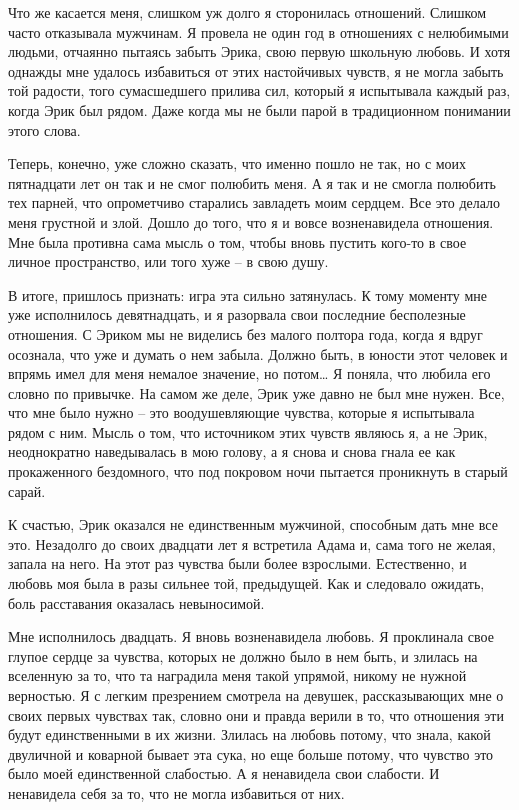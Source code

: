 \documentclass[
]{book}
\begin{document}
Что же касается меня, слишком уж долго я сторонилась отношений. Слишком часто отказывала мужчинам. Я провела не один год в отношениях с нелюбимыми людьми, отчаянно пытаясь забыть Эрика, свою первую школьную любовь. И хотя однажды мне удалось избавиться от этих настойчивых чувств, я не могла забыть той радости, того сумасшедшего прилива сил, который я испытывала каждый раз, когда Эрик был рядом. Даже когда мы не были парой в традиционном понимании этого слова.

Теперь, конечно, уже сложно сказать, что именно пошло не так, но с моих пятнадцати лет он так и не смог полюбить меня. А я так и не смогла полюбить тех парней, что опрометчиво старались завладеть моим сердцем. Все это делало меня грустной и злой. Дошло до того, что я и вовсе возненавидела отношения. Мне была противна сама мысль о том, чтобы вновь пустить кого-то в свое личное пространство, или того хуже -- в свою душу.

В итоге, пришлось признать: игра эта сильно затянулась. К тому моменту мне уже исполнилось девятнадцать, и я разорвала свои последние бесполезные отношения. С Эриком мы не виделись без малого полтора года, когда я вдруг осознала, что уже и думать о нем забыла. Должно быть, в юности этот человек и впрямь имел для меня немалое значение, но потом\ldots{} Я поняла, что любила его словно по привычке. На самом же деле, Эрик уже давно не был мне нужен. Все, что мне было нужно -- это воодушевляющие чувства, которые я испытывала рядом с ним. Мысль о том, что источником этих чувств являюсь я, а не Эрик, неоднократно наведывалась в мою голову, а я снова и снова гнала ее как прокаженного бездомного, что под покровом ночи пытается проникнуть в старый сарай.

К счастью, Эрик оказался не единственным мужчиной, способным дать мне все это. Незадолго до своих двадцати лет я встретила Адама и, сама того не желая, запала на него. На этот раз чувства были более взрослыми. Естественно, и любовь моя была в разы сильнее той, предыдущей. Как и следовало ожидать, боль расставания оказалась невыносимой.

Мне исполнилось двадцать. Я вновь возненавидела любовь. Я проклинала свое глупое сердце за чувства, которых не должно было в нем быть, и злилась на вселенную за то, что та наградила меня такой упрямой, никому не нужной верностью. Я с легким презрением смотрела на девушек, рассказывающих мне о своих первых чувствах так, словно они и правда верили в то, что отношения эти будут единственными в их жизни. Злилась на любовь потому, что знала, какой двуличной и коварной бывает эта сука, но еще больше потому, что чувство это было моей единственной слабостью. А я ненавидела свои слабости. И ненавидела себя за то, что не могла избавиться от них.
\end{document}
